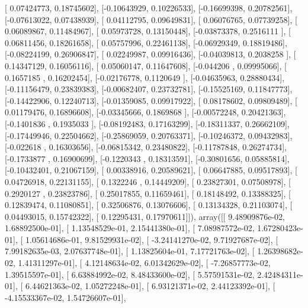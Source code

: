 \documentclass{article}
\begin{document}
       [ 0.07424773,  0.18745602],
       [-0.10643929,  0.10226533],
       [-0.16699398,  0.20782561],
       [-0.07613022,  0.07438939],
       [ 0.04112795,  0.09649831],
       [ 0.06076765,  0.07739258],
       [ 0.06089867,  0.11484967],
       [ 0.05973728,  0.13150448],
       [-0.03873378,  0.2516111 ],
       [ 0.06811456,  0.18261658],
       [ 0.05757996,  0.22461138],
       [-0.06929349,  0.18819486],
       [-0.08224199,  0.26906847],
       [ 0.02249987,  0.09916436],
       [-0.04039813,  0.2038258 ],
       [ 0.14347129,  0.16056116],
       [ 0.05060147,  0.11647608],
       [-0.044206  ,  0.09995066],
       [ 0.1657185 ,  0.16202454],
       [-0.02176778,  0.1120649 ],
       [-0.04635963,  0.28880434],
       [-0.11156479,  0.23839383],
       [-0.00682407,  0.23732781],
       [-0.15525169,  0.11847773],
       [-0.14422906,  0.12240713],
       [-0.01359085,  0.09917922],
       [ 0.08178602,  0.09809489],
       [ 0.01179476,  0.16896608],
       [-0.03345666,  0.1869868 ],
       [-0.00572248,  0.20421363],
       [-0.1401836 ,  0.1935033 ],
       [-0.08192483,  0.17163299],
       [-0.18311337,  0.26662109],
       [-0.17449946,  0.22504662],
       [-0.25869059,  0.20763371],
       [-0.10246372,  0.09432983],
       [-0.022618  ,  0.16303656],
       [-0.06815342,  0.23480822],
       [-0.11787848,  0.26274734],
       [-0.1733877 ,  0.16900699],
       [-0.1220343 ,  0.18313591],
       [-0.30801656,  0.05885814],
       [-0.10432401,  0.21067159],
       [ 0.00338916,  0.20589621],
       [ 0.06647885,  0.09517893],
       [ 0.04726918,  0.22131155],
       [ 0.1322246 ,  0.14449209],
       [ 0.23827301,  0.07508978],
       [ 0.2920127 ,  0.23823786],
       [ 0.25017855,  0.11659461],
       [ 0.18148492,  0.13388325],
       [ 0.12839474,  0.11080851],
       [ 0.32506876,  0.13076606],
       [ 0.13134328,  0.21103074],
       [ 0.04493015,  0.15742322],
       [ 0.12295431,  0.17970611]]), array([[  9.48909876e-02,   1.68892500e-01],
       [  1.13548529e-01,   2.15441380e-01],
       [  7.08987572e-02,   1.67280423e-01],
       [  1.05614686e-01,   9.81529931e-02],
       [ -3.24141270e-02,   9.71927687e-02],
       [  7.99182635e-03,   2.07637748e-01],
       [  1.13825604e-01,   7.17721763e-02],
       [  1.26398682e-02,   1.41311297e-01],
       [  4.12148634e-02,   6.01342629e-02],
       [ -7.26857773e-02,   1.39515597e-01],
       [  6.63884992e-02,   8.48433600e-02],
       [  5.57591531e-02,   2.42484311e-01],
       [  6.44621363e-02,   1.05272248e-01],
       [  6.93121371e-02,   2.44123392e-01],
       [ -4.15533367e-02,   1.54726607e-01],
\end{document}
